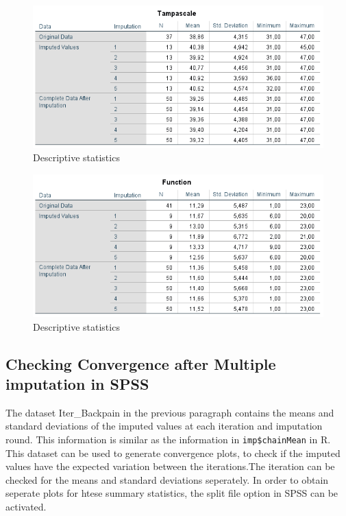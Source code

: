 \documentclass[]{book}
\begin{document}
\begin{figure}

{\centering \includegraphics[width=0.9\linewidth]{images/tab4.7} 

}

\caption{Descriptive statistics}\label{fig:tab4-7}
\end{figure}\begin{figure}

{\centering \includegraphics[width=0.9\linewidth]{images/tab4.8} 

}

\caption{Descriptive statistics}\label{fig:tab4-7}
\end{figure}

\subsection{Checking Convergence after Multiple imputation in
SPSS}\label{checking-convergence-after-multiple-imputation-in-spss}

The dataset Iter\_Backpain in the previous paragraph contains the means
and standard deviations of the imputed values at each iteration and
imputation round. This information is similar as the information in
\texttt{imp\$chainMean} in R. This dataset can be used to generate
convergence plots, to check if the imputed values have the expected
variation between the iterations.The iteration can be checked for the
means and standard deviations seperately. In order to obtain seperate
plots for htese summary statistics, the split file option in SPSS can be
activated.
\end{document}
